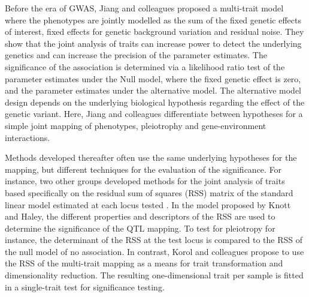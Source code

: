 Before the era of GWAS, Jiang and colleagues \parencite*{Jiang1995} proposed a multi-trait model where the phenotypes are jointly modelled as the sum of the fixed genetic effects of interest, fixed effects for genetic background variation and residual noise. They show that the joint analysis of traits can increase power to detect the underlying genetics and can increase the precision of the parameter estimates. The significance of the association is determined via a likelihood ratio test of the parameter estimates under the Null model, where the fixed genetic effect is zero, and the parameter estimates under the alternative model. The alternative model design depends on the underlying biological hypothesis regarding the effect of the genetic variant. Here, Jiang and colleagues differentiate between hypotheses for a simple joint mapping of phenotypes, pleiotrophy and gene-environment interactions.%

Methods developed thereafter often use the same underlying hypotheses for the mapping, but different techniques for the evaluation of the significance. For instance, two other groups developed methods for the joint analysis of traits based specifically on the residual sum of squares (RSS) matrix of the standard linear model estimated at each locus tested \citep{Knott2000,Korol2001}. In the model proposed by Knott and Haley, the different properties and descriptors of the RSS are used to determine the significance of the QTL mapping. To test for pleiotropy for instance, the determinant of the RSS at the test locus is compared to the RSS of the null model of no association. In contrast, Korol and colleagues propose to use the RSS of the multi-trait mapping as a means for trait transformation and dimensionality reduction. The resulting one-dimensional trait per sample is fitted in a single-trait test for significance testing.  

